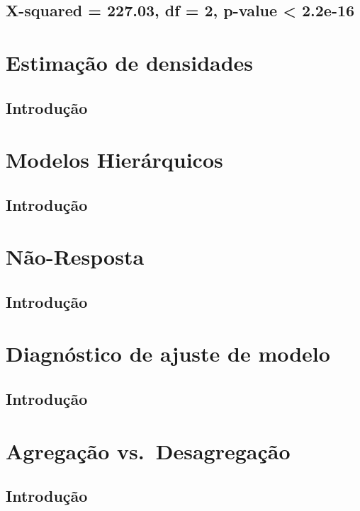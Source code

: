 \documentclass[]{book}
\theoremstyle{definition}
\theoremstyle{definition}
\theoremstyle{definition}
\theoremstyle{remark}
\begin{document}
\section{X-squared = 227.03, df = 2, p-value \textless{}
2.2e-16}\label{x-squared-227.03-df-2-p-value-2.2e-16}

\chapter{Estimação de densidades}\label{estimacao-de-densidades}

\section{Introdução}\label{introducao-3}

\chapter{Modelos Hierárquicos}\label{modelos-hierarquicos}

\section{Introdução}\label{introducao-4}

\chapter{Não-Resposta}\label{nao-resposta}

\section{Introdução}\label{introducao-5}

\chapter{Diagnóstico de ajuste de
modelo}\label{diagnostico-de-ajuste-de-modelo}

\section{Introdução}\label{introducao-6}

\chapter{Agregação vs.~Desagregação}\label{agregdesag}

\section{Introdução}\label{introducao-7}
\end{document}
